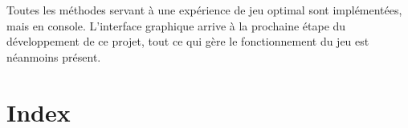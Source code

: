 \documentclass{article}
\begin{document}
	Toutes les méthodes servant à une expérience de jeu optimal sont implémentées, mais en console.
	L'interface graphique arrive à la prochaine étape du développement de ce projet, tout ce qui gère le fonctionnement du jeu est néanmoins présent.

\newpage

\section{Index}
		\printglossary[type=glossary, style=Index, title=]
\end{document}
